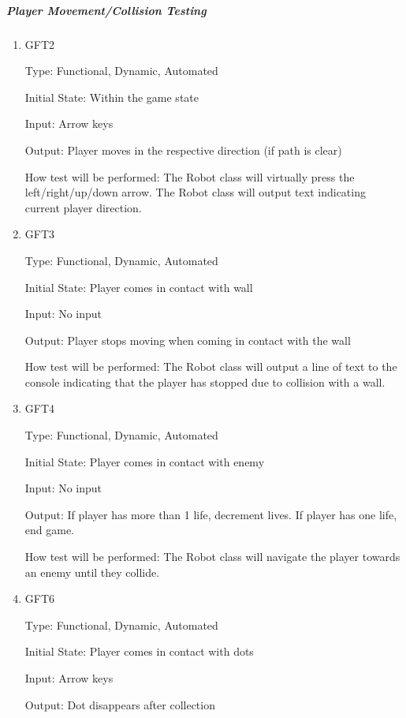 \documentclass[12pt, titlepage]{article}
\begin{document}
\subparagraph{Player Movement/Collision Testing}

\begin{enumerate}

\item{GFT2\\}

Type: Functional, Dynamic, Automated
					
Initial State: Within the game state
					
Input: Arrow keys
					
Output: Player moves in the respective direction (if path is clear)
					
How test will be performed: The Robot class will virtually press the left/right/up/down arrow. The Robot class will output text indicating current player direction.

\item{GFT3\\}

Type: Functional, Dynamic, Automated
					
Initial State: Player comes in contact with wall
					
Input: No input
					
Output: Player stops moving when coming in contact with the wall

How test will be performed: The Robot class will output a line of text to the console indicating that the player has stopped due to collision with a wall.

\item{GFT4\\}

Type: Functional, Dynamic, Automated
					
Initial State: Player comes in contact with enemy
					
Input: No input
					
Output: If player has more than 1 life, decrement lives. If player has one life, end game.

How test will be performed: The Robot class will navigate the player towards an enemy until they collide.


\item{GFT6\\}

Type: Functional, Dynamic, Automated
					
Initial State: Player comes in contact with dots
					
Input: Arrow keys
					
Output: Dot disappears after collection


\end{enumerate}
\end{document}
